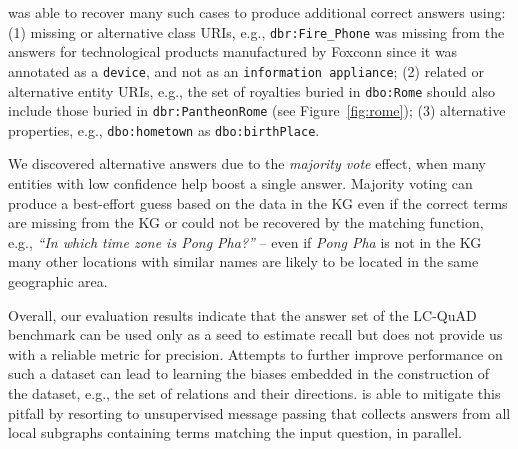 \OurApproach{} was able to recover many such cases to produce additional correct answers using: (1) missing or alternative class URIs, e.g., {\tt\small dbr:Fire\_Phone} was missing from the answers for technological products manufactured by Foxconn since it was annotated as a {\tt\small device}, and not as an {\tt\small information appliance}; (2) related or alternative entity URIs, e.g., the set of royalties buried in {\tt\small dbo:Rome} should also include those buried in {\tt\small dbr:PantheonRome} (see Figure~\ref{fig:rome}); (3) alternative properties, e.g., {\tt\small dbo:hometown} as {\tt\small dbo:birthPlace}. 




We discovered alternative answers due to the \textit{majority vote} effect, when many entities with low confidence help boost a single answer.
Majority voting can produce a best-effort guess based on the data in the KG even if the correct terms are missing from the KG or could not be recovered by the matching function, e.g., \emph{``In which time zone is Pong Pha?''} -- even if \emph{Pong Pha} is not in the KG many other locations with similar names are likely to be located in the same geographic area.

Overall, our evaluation results indicate that the answer set of the LC-QuAD benchmark can be used only as a seed to estimate recall but does not provide us with a reliable metric for precision.
Attempts to further improve performance on such a dataset can lead to learning the biases embedded in the construction of the dataset, e.g., the set of relations and their directions.
\OurApproach{} is able to mitigate this pitfall by resorting to 
unsupervised message passing that collects answers from all local subgraphs containing terms matching the input question, in parallel.
